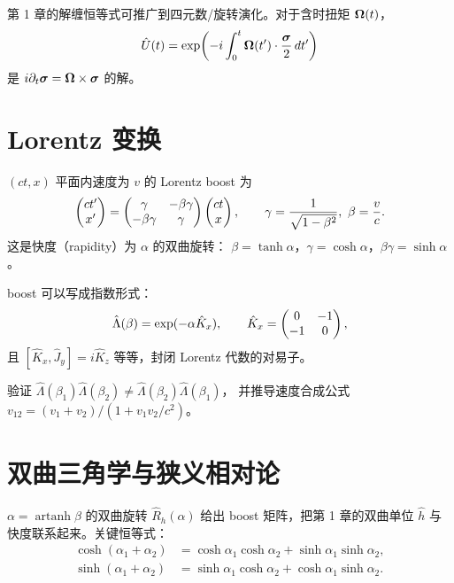 第 1 章的解缠恒等式可推广到四元数/旋转演化。对于含时扭矩 $\bm{\Omega}(t)$，
\begin{equation}
\hat U(t) = \exp\!\left(-i\int_0^t \bm{\Omega}(t')\cdot\frac{\bm{\sigma}}{2}\,dt'\right)
\label{eq:5.3.2}
\end{equation}
是 $i\partial_t\bm{\sigma} = \bm{\Omega}\times\bm{\sigma}$ 的解。

\section{Lorentz 变换}

$(ct,x)$ 平面内速度为 $v$ 的 Lorentz boost 为
\begin{equation}
\begin{pmatrix} ct'\\x' \end{pmatrix}
=
\begin{pmatrix}\gamma&-\beta\gamma\\-\beta\gamma&\gamma\end{pmatrix}
\begin{pmatrix} ct\\x \end{pmatrix},
\qquad
\gamma=\frac{1}{\sqrt{1-\beta^2}},\ \beta=\frac{v}{c}.
\label{eq:5.4.1}
\end{equation}
这是快度（rapidity）为 $\alpha$ 的双曲旋转：
$\beta=\tanh\alpha$，$\gamma=\cosh\alpha$，$\beta\gamma=\sinh\alpha$。

boost 可以写成指数形式：
\begin{equation}
\hat\Lambda(\beta) = \exp(-\alpha\hat K_x), \qquad
\hat K_x = \begin{pmatrix}0&-1\\-1&0\end{pmatrix},
\label{eq:5.4.2}
\end{equation}
且 $[\hat K_x,\hat J_y]=i\hat K_z$ 等等，封闭 Lorentz 代数的对易子。

\begin{exercise}
验证 $\hat\Lambda(\beta_1)\hat\Lambda(\beta_2)\neq\hat\Lambda(\beta_2)\hat\Lambda(\beta_1)$，
并推导速度合成公式
$v_{12}=(v_1+v_2)/(1+v_1v_2/c^2)$。
\end{exercise}

\section{双曲三角学与狭义相对论}

$\alpha=\operatorname{artanh}\beta$ 的双曲旋转 $\hat R_h(\alpha)$ 给出 boost 矩阵，把第 1 章的双曲单位 $\hat h$ 与快度联系起来。关键恒等式：
\begin{align}
\cosh(\alpha_1+\alpha_2) &= \cosh\alpha_1\cosh\alpha_2 + \sinh\alpha_1\sinh\alpha_2,\\
\sinh(\alpha_1+\alpha_2) &= \sinh\alpha_1\cosh\alpha_2 + \cosh\alpha_1\sinh\alpha_2.
\label{eq:5.5.1}
\end{align}


